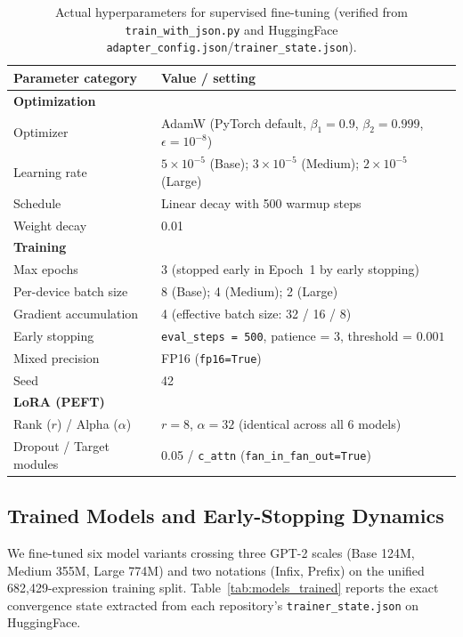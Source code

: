 \begin{table}[htbp]
\centering
\caption{Actual hyperparameters for supervised fine-tuning (verified from \texttt{train\_with\_json.py} and HuggingFace \texttt{adapter\_config.json}/\texttt{trainer\_state.json}).}
\label{tab:hyperparameters}
\begin{tabularx}{0.88\textwidth}{lX}
\toprule
\textbf{Parameter category} & \textbf{Value / setting} \\
\midrule
\textbf{Optimization} & \\
\quad Optimizer & AdamW (PyTorch default, $\beta_1 = 0.9$, $\beta_2 = 0.999$, $\epsilon = 10^{-8}$) \\
\quad Learning rate & $5 \times 10^{-5}$ (Base); $3 \times 10^{-5}$ (Medium); $2 \times 10^{-5}$ (Large) \\
\quad Schedule & Linear decay with 500 warmup steps \\
\quad Weight decay & 0.01 \\
\addlinespace
\textbf{Training} & \\
\quad Max epochs & 3 (stopped early in Epoch~1 by early stopping) \\
\quad Per-device batch size & 8 (Base); 4 (Medium); 2 (Large) \\
\quad Gradient accumulation & 4 (effective batch size: 32 / 16 / 8) \\
\quad Early stopping & \texttt{eval\_steps = 500}, patience = 3, threshold = $0.001$ \\
\quad Mixed precision & FP16 (\texttt{fp16=True}) \\
\quad Seed & 42 \\
\addlinespace
\textbf{LoRA (PEFT)} & \\
\quad Rank ($r$) / Alpha ($\alpha$) & $r = 8$, $\alpha = 32$ (identical across all 6 models) \\
\quad Dropout / Target modules & 0.05 / \texttt{c\_attn} (\texttt{fan\_in\_fan\_out=True}) \\
\bottomrule
\end{tabularx}
\end{table}

\subsection{Trained Models and Early-Stopping Dynamics}
\label{sec:trained_models}

We fine-tuned six model variants crossing three GPT-2 scales (Base 124M, Medium 355M, Large 774M) and two notations (Infix, Prefix) on the unified 682{,}429-expression training split. Table~\ref{tab:models_trained} reports the exact convergence state extracted from each repository's \texttt{trainer\_state.json} on HuggingFace.

